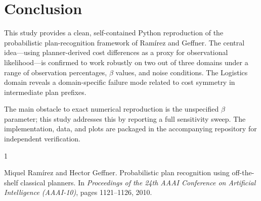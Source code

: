 \documentclass[11pt,a4paper]{article}
\begin{document}
\section{Conclusion}

This study provides a clean, self-contained Python reproduction of the
probabilistic plan-recognition framework of Ram\'{i}rez and Geffner.
The central idea---using planner-derived cost differences as a proxy for
observational likelihood---is confirmed to work robustly on two out of
three domains under a range of observation percentages, $\beta$ values,
and noise conditions.  The Logistics domain reveals a domain-specific
failure mode related to cost symmetry in intermediate plan prefixes.

The main obstacle to exact numerical reproduction is the unspecified
$\beta$ parameter; this study addresses this by reporting a full
sensitivity sweep.  The implementation, data, and plots are packaged in
the accompanying repository for independent verification.


\begin{thebibliography}{1}

Miquel Ram\'{i}rez and Hector Geffner.
\newblock Probabilistic plan recognition using off-the-shelf classical planners.
\newblock In \emph{Proceedings of the 24th AAAI Conference on Artificial
  Intelligence (AAAI-10)}, pages 1121--1126, 2010.

\end{thebibliography}
\end{document}
